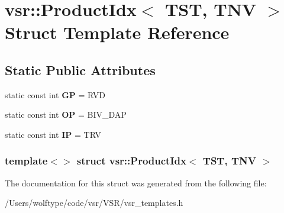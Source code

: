 \hypertarget{structvsr_1_1_product_idx_3_01_t_s_t_00_01_t_n_v_01_4}{\section{vsr\-:\-:Product\-Idx$<$ T\-S\-T, T\-N\-V $>$ Struct Template Reference}
\label{structvsr_1_1_product_idx_3_01_t_s_t_00_01_t_n_v_01_4}
}
\subsection*{Static Public Attributes}
\begin{DoxyCompactItemize}
\item 
\hypertarget{structvsr_1_1_product_idx_3_01_t_s_t_00_01_t_n_v_01_4_ac64add7a9fbfab119a30b740a143fdb7}{static const int {\bfseries G\-P} = R\-V\-D}\label{structvsr_1_1_product_idx_3_01_t_s_t_00_01_t_n_v_01_4_ac64add7a9fbfab119a30b740a143fdb7}

\item 
\hypertarget{structvsr_1_1_product_idx_3_01_t_s_t_00_01_t_n_v_01_4_a5c10b9c7827e9b5214b9a21b801f6b6c}{static const int {\bfseries O\-P} = B\-I\-V\-\_\-\-D\-A\-P}\label{structvsr_1_1_product_idx_3_01_t_s_t_00_01_t_n_v_01_4_a5c10b9c7827e9b5214b9a21b801f6b6c}

\item 
\hypertarget{structvsr_1_1_product_idx_3_01_t_s_t_00_01_t_n_v_01_4_abc606fa1ae4fbc9c37df91c21c76c9f1}{static const int {\bfseries I\-P} = T\-R\-V}\label{structvsr_1_1_product_idx_3_01_t_s_t_00_01_t_n_v_01_4_abc606fa1ae4fbc9c37df91c21c76c9f1}

\end{DoxyCompactItemize}
\subsubsection*{template$<$$>$ struct vsr\-::\-Product\-Idx$<$ T\-S\-T, T\-N\-V $>$}



The documentation for this struct was generated from the following file\-:\begin{DoxyCompactItemize}
\item 
/\-Users/wolftype/code/vsr/\-V\-S\-R/vsr\-\_\-templates.\-h\end{DoxyCompactItemize}
